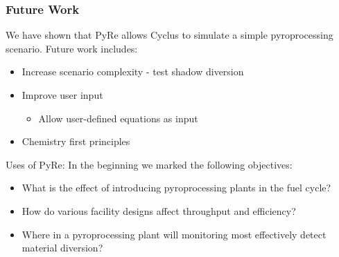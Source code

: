 \begin{frame}
  \frametitle{Future Work}
  We have shown that PyRe allows Cyclus to simulate a simple pyroprocessing scenario. Future work includes:
  \begin{itemize}
     \item Increase scenario complexity - test shadow diversion
     \item Improve user input
     \begin{itemize}
      	\item Allow user-defined equations as input
     \end{itemize}
     \item Chemistry first principles
  \end{itemize}
\begin{block}{Uses of PyRe:}
	In the beginning we marked the following objectives:
\begin{itemize}
	\item What is the effect of introducing pyroprocessing plants in the fuel cycle?
	\item How do various facility designs affect throughput and efficiency?
	\item Where in a pyroprocessing plant will monitoring most 
	effectively detect material diversion?
\end{itemize}
\end{block}
\end{frame}

